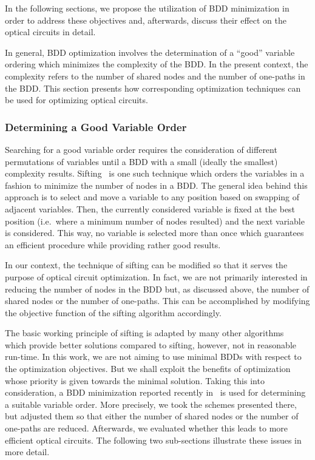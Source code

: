 \documentclass[10pt,letterpaper,twoside,openright]{book}
\begin{document}
In the following sections, we propose the utilization of BDD minimization in order to address these objectives and, afterwards, discuss their effect on the optical circuits in detail.   


In general, BDD optimization involves the determination of a ``good'' variable ordering which minimizes the complexity of the BDD. In the present context, the complexity refers to the number of shared nodes and the number of one-paths in the BDD. This section presents how corresponding optimization techniques can be used for optimizing optical circuits. 

\subsubsection{Determining a Good Variable Order}

Searching for a good variable order requires the consideration of different permutations of variables until a BDD with a small (ideally the smallest) complexity results. Sifting~\cite{Rudell1993} is one such technique which orders the variables in a fashion to minimize the number of nodes in a BDD. The general idea behind this approach is to select and move a variable to any position based on swapping of adjacent variables. Then, the currently considered variable is fixed at the best position (i.e.~where a minimum number of nodes resulted) and the next variable is considered. This way, no variable is selected more than once which guarantees an efficient procedure while providing rather good results.

In our context, the technique of sifting can be modified so that it serves the purpose of optical circuit optimization. 
In fact, we are not primarily interested in reducing the number of nodes in the BDD but, as discussed above, the number of shared nodes or the number of one-paths.
This can be accomplished by modifying the objective function of the sifting algorithm accordingly.

The basic working principle of sifting is adapted by many other algorithms~\cite{Bollig95,FeyD06,ShirinzadehSD15} which provide better solutions compared to sifting, however, not in reasonable run-time. 
In this work, we are not aiming to use minimal BDDs with respect to the optimization objectives. But we shall exploit the benefits of 
optimization whose priority is given towards the minimal solution. Taking this into consideration, a BDD minimization reported recently in~\cite{ShirinzadehSD15} is used for 
determining a suitable variable order. 
More precisely, we took the schemes presented there, but adjusted them so that either the number of shared nodes or the number of one-paths are reduced.
Afterwards, we evaluated whether this leads to more efficient optical circuits. 
The following two sub-sections illustrate these issues in more detail.
\end{document}
